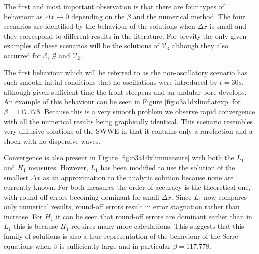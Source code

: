 \documentclass[SingleSpace,12pt,Proceedings]{Serre_ASCE}
\begin{document}
The first and most important observation is that there are four types of behaviour as $\Delta x \rightarrow 0$ depending on the $\beta$ and the numerical method. The four scenarios are identified by the behaviour of the solutions when $\Delta x$ is small and they correspond to different results in the literature. For brevity the only given examples of these scenarios will be the solutions of $\mathcal{V}_3$ although they also occurred for $\mathcal{E}$, $\mathcal{G}$ and $\mathcal{V}_2$.

The first behaviour which will be referred to as the non-oscillatory scenario has such smooth initial conditions that no oscillations were introduced by $t= 30s$, although given sufficient time the front steepens and an undular bore develops. An example of this behaviour can be seen in Figure \ref{fig:o3a1dxlimflatexp} for $\beta = 117.778$. Because this is a very smooth problem we observe rapid convergence with all the numerical results being graphically identical. This scenario resembles very diffusive solutions of the SWWE in that it contains only a rarefaction and a shock with no dispersive waves. 

Convergence is also present in Figure \ref{fig:o3a1dxlimmeasure} with both the $L_1$ and $H_1$ measures. However, $L_1$ has been modified to use the solution of the smallest $\Delta x$ as an approximation to the analytic solution because none are currently known. For both measures the order of accuracy is the theoretical one, with round-off errors becoming dominant for small $\Delta x$. Since $L_1$ now compares only numerical results, round-off errors result in error stagnation rather than increase. For $H_1$ it can be seen that round-off errors are dominant earlier than in $L_1$ this is because $H_1$ requires many more calculations. This suggests that this family of solutions is also a true representation of the behaviour of the Serre equations when $\beta$ is sufficiently large and in particular $\beta = 117.778$. 
\end{document}
